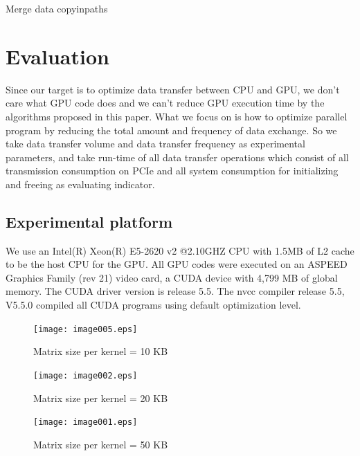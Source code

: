 \documentclass[10pt,conference]{IEEEtran}
\begin{document}
\begin{algorithm}
\caption{Merge data copyinpaths}
\label{alg:merge_copyinpaths}
\end{algorithm}



\section{Evaluation}
Since our target is to optimize data transfer between CPU and GPU, we don't care what GPU code does and we can't reduce GPU execution time by the algorithms proposed in this paper. What we focus on is how to optimize parallel program by reducing the total amount and frequency of data exchange. So we take data transfer volume and data transfer frequency as experimental parameters, and take run-time of all data transfer operations which consist of all transmission consumption on PCIe and all system consumption for initializing and freeing as evaluating indicator.
\subsection{Experimental platform}
We use an Intel(R) Xeon(R) E5-2620 v2 @2.10GHZ CPU with 1.5MB of L2 cache to be the host CPU for the GPU. All GPU codes were executed on an ASPEED Graphics Family (rev 21) video card, a CUDA device with 4,799 MB of global memory. The CUDA driver version is release 5.5. The nvcc compiler release 5.5, V5.5.0 compiled all CUDA programs using default optimization level.
\begin{figure}
 \centering
 \texttt{[image: image005.eps]}
 \caption{Matrix size per kernel = 10 KB}\label{figure4}
\end{figure}
\begin{figure}
 \centering
 \texttt{[image: image002.eps]}
 \caption{Matrix size per kernel = 20 KB}\label{figure5}
\end{figure}
\begin{figure}
 \centering
 \texttt{[image: image001.eps]}
 \caption{Matrix size per kernel = 50 KB}\label{figure6}
\end{figure}
\end{document}
